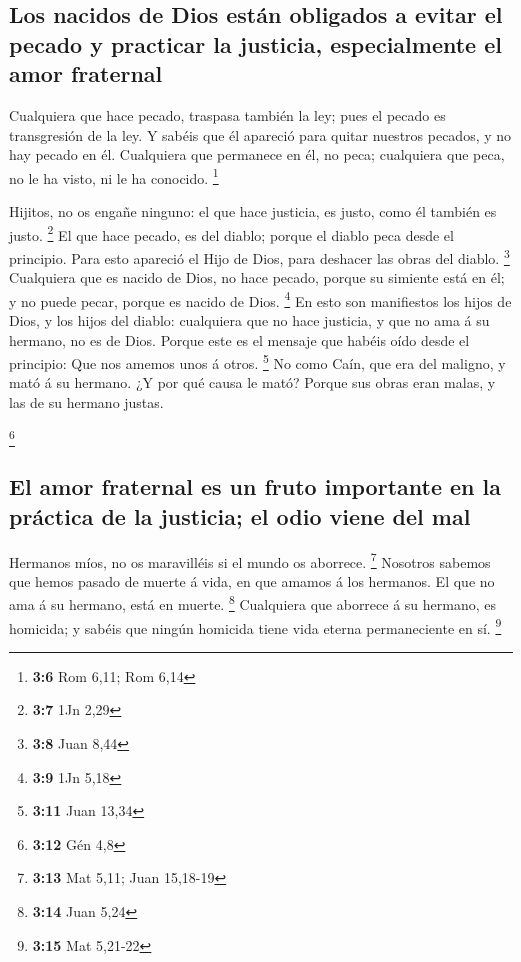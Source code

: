 \hypertarget{los-nacidos-de-dios-estuxe1n-obligados-a-evitar-el-pecado-y-practicar-la-justicia-especialmente-el-amor-fraternal}{%
\subsection{Los nacidos de Dios están obligados a evitar el pecado y
practicar la justicia, especialmente el amor
fraternal}\label{los-nacidos-de-dios-estuxe1n-obligados-a-evitar-el-pecado-y-practicar-la-justicia-especialmente-el-amor-fraternal}}

 Cualquiera que hace pecado, traspasa también la ley; pues
el pecado es transgresión de la ley.  Y sabéis que él
apareció para quitar nuestros pecados, y no hay pecado en él.
 Cualquiera que permanece en él, no peca; cualquiera que
peca, no le ha visto, ni le ha conocido. \footnote{\textbf{3:6} Rom
  6,11; Rom 6,14}

 Hijitos, no os engañe ninguno: el que hace justicia, es
justo, como él también es justo. \footnote{\textbf{3:7} 1Jn 2,29}
 El que hace pecado, es del diablo; porque el diablo peca
desde el principio. Para esto apareció el Hijo de Dios, para deshacer
las obras del diablo. \footnote{\textbf{3:8} Juan 8,44} 
Cualquiera que es nacido de Dios, no hace pecado, porque su simiente
está en él; y no puede pecar, porque es nacido de Dios. \footnote{\textbf{3:9}
  1Jn 5,18}  En esto son manifiestos los hijos de Dios, y
los hijos del diablo: cualquiera que no hace justicia, y que no ama á su
hermano, no es de Dios.  Porque este es el mensaje que
habéis oído desde el principio: Que nos amemos unos á otros. \footnote{\textbf{3:11}
  Juan 13,34}  No como Caín, que era del maligno, y mató á
su hermano. ¿Y por qué causa le mató? Porque sus obras eran malas, y las
de su hermano justas.

\footnote{\textbf{3:12} Gén 4,8}

\hypertarget{el-amor-fraternal-es-un-fruto-importante-en-la-pruxe1ctica-de-la-justicia-el-odio-viene-del-mal}{%
\subsection{El amor fraternal es un fruto importante en la práctica de
la justicia; el odio viene del
mal}\label{el-amor-fraternal-es-un-fruto-importante-en-la-pruxe1ctica-de-la-justicia-el-odio-viene-del-mal}}

 Hermanos míos, no os maravilléis si el mundo os aborrece.
\footnote{\textbf{3:13} Mat 5,11; Juan 15,18-19}  Nosotros
sabemos que hemos pasado de muerte á vida, en que amamos á los hermanos.
El que no ama á su hermano, está en muerte. \footnote{\textbf{3:14} Juan
  5,24}  Cualquiera que aborrece á su hermano, es homicida;
y sabéis que ningún homicida tiene vida eterna permaneciente en sí.
\footnote{\textbf{3:15} Mat 5,21-22}

